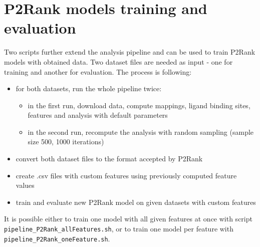\section{P2Rank models training and evaluation}

Two scripts further extend the analysis pipeline and can be used to train P2Rank models with obtained data. Two dataset files are needed as input - one for training and another for evaluation. The process is following:

\begin{itemize}
\item for both datasets, run the whole pipeline twice:
	\begin{itemize}
	\item in the first run, download data, compute mappings, ligand binding sites, features and analysis with default parameters
	\item in the second run, recompute the analysis with random sampling (sample size 500, 1000 iterations)
	\end{itemize}
\item convert both dataset files to the format accepted by P2Rank
\item create .csv files with custom features using previously computed feature values
\item train and evaluate new P2Rank model on given datasets with custom features
\end{itemize}

It is possible either to train one model with all given features at once with script \texttt{pipeline\_P2Rank\_allFeatures.sh}, or to train one model per feature with \texttt{pipeline\_P2Rank\_oneFeature.sh}.



